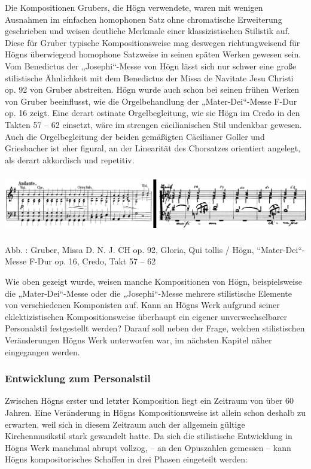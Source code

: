 \documentclass[a4paper]{article}
\newcounter{Abb}
\renewcommand\theAbb{\arabic{Abb}}
\begin{document}
Die Kompositionen Grubers, die Högn verwendete, waren mit wenigen
Ausnahmen im einfachen homophonen Satz ohne chromatische Erweiterung
geschrieben und weisen deutliche Merkmale einer klassizistischen
Stilistik auf. Diese für Gruber typische Kompositionsweise mag deswegen
richtungweisend für Högns überwiegend homophone Satzweise in seinen
späten Werken gewesen sein. Vom Benedictus der „Josephi“-Messe von Högn
lässt sich nur schwer eine große stilistische Ähnlichkeit mit dem
Benedictus der Missa de Navitate Jesu Christi op. 92 von Gruber
abstreiten. Högn wurde auch schon bei seinen frühen Werken von Gruber
beeinflusst, wie die Orgelbehandlung der „Mater-Dei“-Messe F-Dur op. 16
zeigt. Eine derart ostinate Orgelbegleitung, wie sie Högn im Credo in
den Takten 57 – 62 einsetzt, wäre im strengen cäcilianischen Stil
undenkbar gewesen. Auch die Orgelbegleitung der beiden gemäßigten
Cäcilianer Goller und Griesbacher ist eher figural, an der Linearität
des Chorsatzes orientiert angelegt, als derart akkordisch und
repetitiv.


\includegraphics[width=15.977cm,height=2.589cm]{pictures/zulassungsarbeit-img094.png}


Abb. \stepcounter{Abb}{\theAbb}: Gruber, Missa D. N. J. CH op. 92,
Gloria, Qui tollis / Högn, “Mater-Dei“-Messe F-Dur op. 16, Credo, Takt
57 – 62

Wie oben gezeigt wurde, weisen manche Kompositionen von Högn,
beispielsweise die „Mater-Dei“-Messe oder die „Josephi“-Messe mehrere
stilistische Elemente von verschiedenen Komponisten auf. Kann an Högns
Werk aufgrund seiner eklektizistischen Kompositionsweise überhaupt ein
eigener unverwechselbarer Personalstil festgestellt werden? Darauf soll
neben der Frage, welchen stilistischen Veränderungen Högns Werk
unterworfen war, im nächsten Kapitel näher eingegangen werden.

\subsubsection{Entwicklung zum Personalstil}
\hypertarget{RefHeadingToc100333751}{}Zwischen Högns erster und letzter
Komposition liegt ein Zeitraum von über 60 Jahren. Eine Veränderung in
Högns Kompositionsweise ist allein schon deshalb zu erwarten, weil sich
in diesem Zeitraum auch der allgemein gültige Kirchenmusikstil stark
gewandelt hatte. Da sich die stilistische Entwicklung in Högns Werk
manchmal abrupt vollzog, – an den Opuszahlen gemessen – kann Högns
kompositorisches Schaffen in drei Phasen eingeteilt werden:
\end{document}
